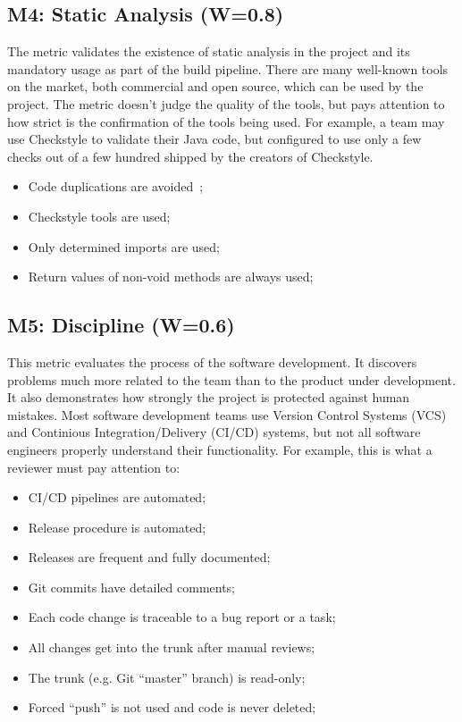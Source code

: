 \documentclass[12pt,oneside]{article}
\begin{document}
\subsection{M4: Static Analysis (W=0.8)}

The metric validates the existence of static analysis in the project
and its mandatory usage as part of the build pipeline.
There are many well-known tools on the market, both commercial and
open source, which can be used by the project. The metric doesn't judge
the quality of the tools, but pays attention to how strict is the
confirmation of the tools being used. For example, a team may use Checkstyle
to validate their Java code, but configured to use only a few checks
out of a few hundred shipped by the creators of Checkstyle.

\begin{itemize}
  \item Code duplications are avoided~\citep[pp.39--40]{eo2};
  \item Checkstyle tools are used;
  \item Only determined imports are used;
  \item Return values of non-void methods are always used;
\end{itemize}

\subsection{M5: Discipline (W=0.6)}

This metric evaluates the process of the software
development. It discovers problems much more related to the team than
to the product under development. It also demonstrates how strongly the project is
protected against human mistakes. Most software development teams use
Version Control Systems (VCS) and Continious Integration/Delivery (CI/CD) systems, but not all
software engineers properly understand their functionality. For example, this is what
a reviewer must pay attention to:

\begin{itemize}
  \item CI/CD pipelines are automated;
  \item Release procedure is automated;
  \item Releases are frequent and fully documented;
  \item Git commits have detailed comments;
  \item Each code change is traceable to a bug report or a task;
  \item All changes get into the trunk after manual reviews;
  \item The trunk (e.g. Git ``master'' branch) is read-only;
  \item Forced ``push'' is not used and code is never deleted;
\end{itemize}
\end{document}
